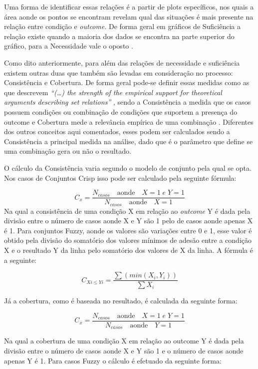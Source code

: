 \documentclass[
	12pt,				%
	oneside,			%
	a4paper,			%
	sumario=tradicional,
	english,			%
	brazil				%
	]{abntex2}
\begin{document}
Uma forma de identificar essas relações é a partir de plots específicos, nos quais a área aonde os pontos se encontram revelam qual das situações é mais presente na relação entre condição e \emph{outcome}. De forma geral em gráficos de Suficiência a relação existe quando a maioria dos dados se encontra na parte superior do gráfico, para a Necessidade vale o oposto \autocite{legewie2013introduction}.

Como dito anteriormente, para além das relações de necessidade e suficiência existem outras duas que também são levadas em consideração no processo: Consistência e Cobertura. De forma geral pode-se definir essas medidas como as que descrevem \emph{``(\ldots) the strength of the empirical support for theoretical arguments describing set relations''} \autocite[292]{ragin_set_2006}, sendo a Consistência a medida que os casos possuem condições ou combinação de condições que suportem a presença do outcome e Cobertura mede a relevância empírica de uma combinação \autocite[292]{ragin_set_2006}. Diferentes dos outros conceitos aqui comentados, esses podem ser calculados sendo a Consistência a principal medida na análise, dado que é o parâmetro que define se uma combinação gera ou não o resultado.

O cálculo da Consistência varia segundo o modelo de conjunto pela qual se opta. Nos casos de Conjuntos Crisp isso pode ser calculado pela seguinte fórmula:

\[ C_{x} = \frac{N_{casos} \quad \mbox {aonde} \quad X = 1 \; e \;  Y = 1}{N_{casos} \quad \mbox{aonde} \quad X = 1} \]
Na qual a consistência de uma condição X em relação ao \emph{outcome} Y é dada pela divisão entre o número de casos aonde X e Y são 1 pelo de casos aonde apenas X é 1. Para conjuntos \acrshort{Fuzzy}, aonde os valores são variações entre 0 e 1, esse valor é obtido pela divisão do somatório dos valores mínimos de adesão entre a condição X e o resultado Y da linha pelo somatório dos valores de X da linha. A fórmula é a seguinte:

\[ C_{Xi\leq Yi} = \frac{\sum (min(X_{i}, Y_{i}))}{\sum X_{i}} \]

Já a cobertura, como é baseada no resultado, é calculada da seguinte forma:

\[ C_{x} = \frac{N_{casos} \quad \mbox {aonde} \quad X = 1 \; e \;  Y = 1}{N_{casos} \quad \mbox{aonde} \quad Y = 1} \]

Na qual a cobertura de uma condição X em relação ao outcome Y é dada pela divisão entre o número de casos aonde X e Y são 1 e o número de casos aonde apenas Y é 1. Para casos Fuzzy o cálculo é efetuado da seguinte forma:
\end{document}
